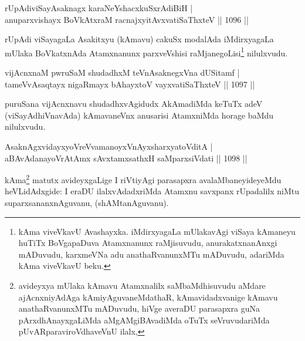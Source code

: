 
\begin{shl}
rUpAdiviSayAsaknagx karaNeYshacxkuSxrAdiBiH | \\
anuparxvishayx BoVkAtxraM racnajxyitAvx\s vatiSaThxteV \hfill||  1096 ||  
\end{shl}

\begin{artha}
rUpAdi viSayagaLa Asakitxyu (kAmavu) cakuSx modalAda iMdirxyagaLa mUlaka BoVkatxnAda Atamxnanunx parxveVshisi raMjanegoLisi\footnote{kAma viveVkavU Avashayxka. iMdirxyagaLa mUlakavAgi viSaya kAmaneyu huTiTx BoVgapaDuva Atamxnanunx raMjisuvudu, anurakatxnanAnxgi mADuvudu, karxmeVNa adu anathaRvanunxMTu mADuvudu, adariMda kAma viveVkavU beku.} nilulxvudu.
\end{artha}

\begin{shl}
vijAcnxnaM pwruSaM shudadhxM teVnA\s \s saknegxVna dUSitamf | \\
tameVvA\s \s saqtayx nigaRmayx bAhayxtoV vayxvatiSaThxteV \hfill||  1097 ||  
\end{shl}

\begin{artha}
puruSana vijAcnxnavu shudadhxvAgidudx AkAmadiMda keTuTx adeV (viSayAdhiVnavAda) kAmavaneVnx anusarisi AtamxniMda horage baMdu nilulxvudu.
\end{artha}


\begin{shl}
AsaknAgxvidayxyoVreVvamanoyxVnAyxsharxyatoVditA | \\
aBAvAdanayoVrAtAmx sAvxtamxsathxH saMparxsiVdati \hfill||  1098 ||  
\end{shl}

\begin{artha}
kAma\footnote{avideyxya mUlaka kAmavu Atamxnalilx saMbaMdhisuvudu aMdare ajAcnxniyAdAga kAmiyAguvaneMdathaR, kAmavidadxvanige kAmavu anathaRvanunxMTu mADuvudu, hiVge averaDU parasapxra guNa pArxdhAnayxgaLiMda aMgAMgiBAvadiMda oTuTx seVruvudariMda pUvARparaviroVdhaveVnU ilalx,} matutx avideyxgaLige I riVtiyAgi parasapxra avalaMbaneyideyeMdu heVLidAdxgide: I eraDU ilalxvAdadxriMda Atamxnu savxpanx rUpadalilx niMtu suparxsananxnAguvanu, (shAMtanAguvanu).
\end{artha}

